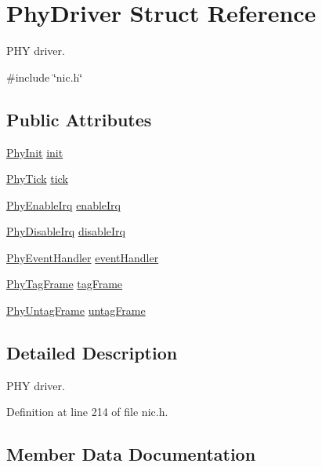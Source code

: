 \hypertarget{structPhyDriver}{}\section{Phy\+Driver Struct Reference}
\label{structPhyDriver}


P\+HY driver.  




{\ttfamily \#include \char`\"{}nic.\+h\char`\"{}}

\subsection*{Public Attributes}
\begin{DoxyCompactItemize}
\item 
\hyperlink{nic_8h_afc0573cbc6dfafe78e7fbea63f882e81}{Phy\+Init} \hyperlink{structPhyDriver_a3b418c8679554610728e3c55ac4a9bfd}{init}
\item 
\hyperlink{nic_8h_ab684b8c15e030cb47dc256480325a732}{Phy\+Tick} \hyperlink{structPhyDriver_af65e9345208a582544bf2bac64a9ab5c}{tick}
\item 
\hyperlink{nic_8h_a439e57db4994b903e75b9ebfedaec34f}{Phy\+Enable\+Irq} \hyperlink{structPhyDriver_a246bf3432a98242439262e35d2dd9b32}{enable\+Irq}
\item 
\hyperlink{nic_8h_a190fda514154e83e25ffcc6c69f59714}{Phy\+Disable\+Irq} \hyperlink{structPhyDriver_a595b004cc76db230dce63bb2769e14b8}{disable\+Irq}
\item 
\hyperlink{nic_8h_a3822e27f4410b42d46b452bbbafb062e}{Phy\+Event\+Handler} \hyperlink{structPhyDriver_a0fc363b870ed98a33e24d878f8998216}{event\+Handler}
\item 
\hyperlink{nic_8h_a85c4a163fe96d6cdaab0e5545369e233}{Phy\+Tag\+Frame} \hyperlink{structPhyDriver_a2306f5493d01b01ade8b74946f15c063}{tag\+Frame}
\item 
\hyperlink{nic_8h_a4f423898a5e094db0fbcc5b7732a3cb9}{Phy\+Untag\+Frame} \hyperlink{structPhyDriver_a9469eaf3ce26cdf723bd7dba3e191877}{untag\+Frame}
\end{DoxyCompactItemize}


\subsection{Detailed Description}
P\+HY driver. 

Definition at line 214 of file nic.\+h.



\subsection{Member Data Documentation}
\mbox{\label{structPhyDriver_a595b004cc76db230dce63bb2769e14b8}} 
